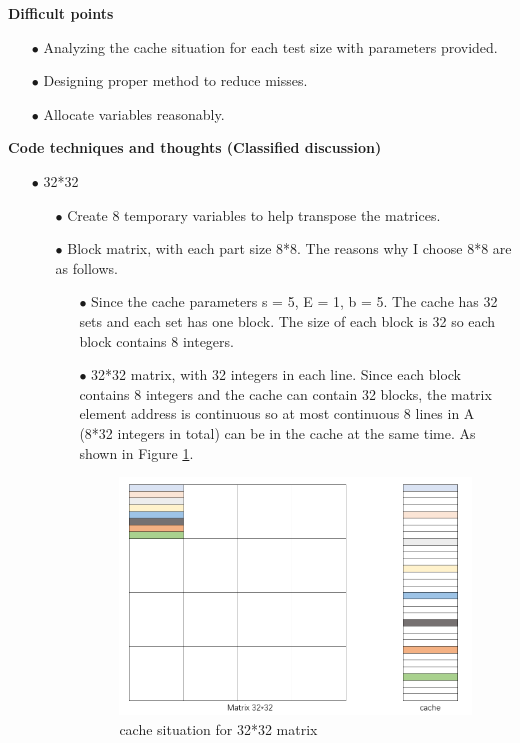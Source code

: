 \documentclass{article}
\begin{document}
\noindent\textbf{Difficult points}
\begin{itemize}
\item[$\bullet$]Analyzing the cache situation for each test size with parameters provided.
\item[$\bullet$]Designing proper method to reduce misses.
\item[$\bullet$]Allocate variables reasonably.
\end{itemize}
\textbf{Code techniques and thoughts (Classified discussion)}
\begin{itemize}
\item[$\bullet$]32*32
\begin{itemize}
\item[$\bullet$]Create 8 temporary variables to help transpose the matrices.
\item[$\bullet$]Block matrix, with each part size 8*8. The reasons why I choose 8*8 are as follows.
\begin{itemize}
\item[$\bullet$]Since the cache parameters s = 5, E = 1, b = 5. The cache has 32 sets and each set has one block. The size of each block is 32 so each block contains 8 integers.
\item[$\bullet$]32*32 matrix, with 32 integers in each line. Since each block contains 8 integers and the cache can contain 32 blocks, the matrix element address is continuous so at most continuous 8 lines in A (8*32 integers in total) can be in the cache at the same time. As shown in Figure \ref{cache situation for 32*32 matrix}.
\begin{figure}[htbp]
		\centering
		\includegraphics[scale=0.7]{M1}
		\caption{cache situation for 32*32 matrix} \label{cache situation for 32*32 matrix}

\end{figure}
\end{itemize}
\end{itemize}
\end{itemize}
\end{document}
